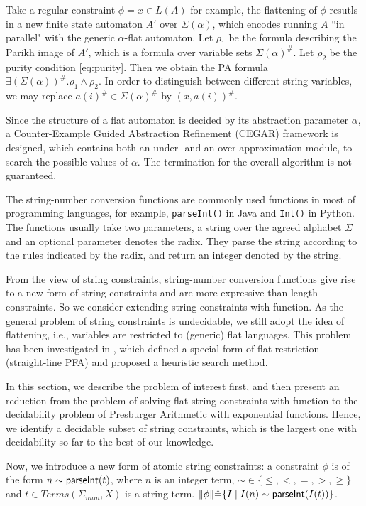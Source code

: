 Take a regular constraint $\phi = x\in L(A)$ for example,
the flattening of $\phi$ resutls in a new finite state automaton $A'$ over $\Sigma(\alpha)$,
which encodes running $A$ ``in parallel" 
with the generic $\alpha$-flat automaton.
Let $\rho_1$ be the formula describing the Parikh image of $A'$,
which is a formula over variable sets $\Sigma(\alpha)^\#$.
Let $\rho_2$ be the purity condition \eqref{eq:purity}.
Then we obtain the PA formula $\exists (\Sigma(\alpha))^\#. \rho_1 \wedge \rho_2$.
In order to distinguish between different string variables,
we may replace $a(i)^\# \in \Sigma(\alpha)^\#$ by $(x,a(i))^\#$.

Since the structure of a flat automaton is decided 
by its abstraction parameter $\alpha$, 
a Counter-Example Guided Abstraction 
Refinement (CEGAR) framework is designed, which contains both an under- and an 
over-approximation module, to search the possible values of $\alpha$.
The termination for the overall algorithm is not guaranteed.


The string-number conversion functions are commonly used functions
in most of programming languages,
for example,
\verb+parseInt()+ in Java and \verb+Int()+ in Python.
The functions usually take two parameters, 
a string over the agreed alphabet $\Sigma$
and an optional parameter denotes the radix.
They parse the string according to the rules indicated by the radix,
and return an integer denoted by the string.

From the view of string constraints,
string-number conversion functions give rise to a new form of string constraints
and are more expressive than length constraints.
So we consider extending string constraints with 
{\parseInt} function. 
As the general problem of string constraints is undecidable,
we still adopt the idea of flattening, 
i.e., variables are restricted to (generic) flat languages.
This problem has been investigated in \cite{POPL20},
which defined a special form of flat restriction (straight-line PFA) and 
proposed a heuristic search method.

In this section, 
we describe the problem of interest first, and then 
present an reduction from the problem of solving flat string constraints with {\parseInt} function
to the decidability problem of Presburger Arithmetic with exponential functions.
Hence, we identify a decidable subset of string constraints, which is the largest one with decidability so far to the best of our knowledge.


Now, we introduce a new form of atomic string constraints: 
a {\parseInt} constraint $\phi$ is of the form 
$n \sim {\textsf{parseInt}}(t)$,
where $n$ is an integer term, $\sim \in \{\le,<,=,>,\ge\}$ and $t\in \textit{Terms}(\Sigma_{\textit{num}},X)$ is a string term.
$\lVert \phi\rVert \hat{=}  \{I \mid I(n)\sim {\textsf{parseInt}}(I(t))\}$.

